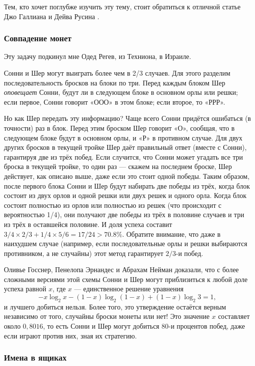 Тем, кто хочет поглубже изучить эту тему, стоит обратиться к отличной статье Джо Галлиана и Дейва Русина \cite{22}.

\subsubsection*{Совпадение монет}

Эту задачу подкинул мне Одед Регев, из Техниона, в Израиле.

Сонни и Шер могут выиграть более чем в 2/3 случаев.
Для этого разделим последовательность бросков на блоки по три.
Перед каждым блоком Шер \emph{оповещает} Сонни, будут ли в следующем блоке в основном орлы или решки;
если первое, Сонни говорит «ООО» в этом блоке; если второе, то «РРР».

Но как Шер передать эту информацию?
Чаще всего Сонни придётся ошибаться (в точности) раз в блок.
Перед этим броском Шер говорит «О», сообщая, что в следующем блоке будут в основном орлы, и «Р» в противном случае.
Для двух других бросков в текущей тройке Шер даёт правильный ответ (вместе с Сонни), гарантируя две из трёх побед.
Если случится, что Сонни может угадать все три броска в текущей тройке,
то один раз --- скажем на последнем броске, Шер действует, как описано выше, даже если это стоит одной победы.
Таким образом, после первого блока Сонни и Шер будут набирать две победы из трёх, когда блок состоит из двух орлов и одной решки или двух решек и одного орла.
Когда блок состоит полностью из орлов или полностью из решек (что происходит с вероятностью 1/4), они получают две победы из трёх в половине случаев и три из трёх в оставшейся половине.
И доля успеха составит $3/4 \times 2/3 + 1/4 \times 5/6 = 17/24 > 70.8\%$.
Обратите внимание, что даже в наихудшем случае (например, если последовательные орлы и решки выбираются противником, а не случайны) этот метод гарантирует $2/3$-и побед.

Оливье Госснер, Пенелопа Эрнандес и Абрахам Нейман \cite{32} доказали, что с более сложными версиями этой схемы Сонни и Шер могут приблизиться к любой доле успеха равной $x$, где $x$ --- единственное решение уравнения
\[-x \log_2 x - (1 - x) \log_2 (1 - x) + (1 - x) \log_2 3 = 1,\]
и лучшего добиться нельзя.
Более того, это утверждение остаётся верным независимо от того, случайны броски монеты или нет!
Это значение $x$ составляет около $0{,}8016$, то есть Сонни и Шер могут добиться  $80$-и процентов побед, даже если играют против них, зная их стратегию.

\subsubsection*{Имена в ящиках}


